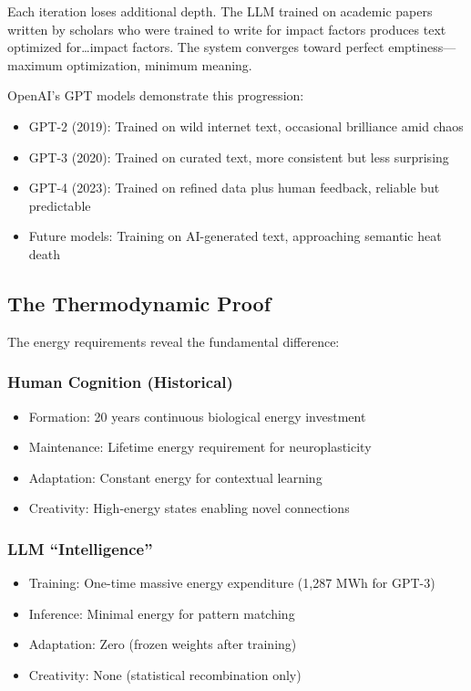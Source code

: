 Each iteration loses additional depth. The LLM trained on academic papers written by scholars who were trained to write for impact factors produces text optimized for\ldots impact factors. The system converges toward perfect emptiness---maximum optimization, minimum meaning.

OpenAI's GPT models demonstrate this progression:
\begin{itemize}
\item GPT-2 (2019): Trained on wild internet text, occasional brilliance amid chaos
\item GPT-3 (2020): Trained on curated text, more consistent but less surprising
\item GPT-4 (2023): Trained on refined data plus human feedback, reliable but predictable
\item Future models: Training on AI-generated text, approaching semantic heat death
\end{itemize}

\subsection{The Thermodynamic Proof}

The energy requirements reveal the fundamental difference:

\subsubsection{Human Cognition (Historical)}
\begin{itemize}
\item Formation: 20 years continuous biological energy investment
\item Maintenance: Lifetime energy requirement for neuroplasticity
\item Adaptation: Constant energy for contextual learning
\item Creativity: High-energy states enabling novel connections
\end{itemize}

\subsubsection{LLM ``Intelligence''}
\begin{itemize}
\item Training: One-time massive energy expenditure (1,287 MWh for GPT-3)
\item Inference: Minimal energy for pattern matching
\item Adaptation: Zero (frozen weights after training)
\item Creativity: None (statistical recombination only)
\end{itemize}


